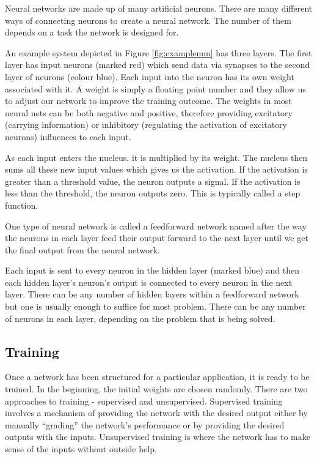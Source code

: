 Neural networks are made up of many artificial neurons. There are many different ways of connecting neurons to create a neural network. The number of them depends on a task the network is designed for.

An example system depicted in Figure \ref{fig:examplennn} has three layers. The first layer has input neurons (marked red) which send data via synapses to the second layer of neurons (colour blue). Each input into the neuron has its own weight associated with it. A weight is simply a floating point number and they allow us to adjust our network to improve the training outcome. The weights in most neural nets can be both negative and positive, therefore providing excitatory (carrying information) or inhibitory (regulating the activation of excitatory neurons) influences to each input. 

As each input enters the nucleus, it is multiplied by its weight. The nucleus then sums all these new input values which gives us the activation. If the activation is greater than a threshold value, the neuron outputs a signal. If the activation is less than the threshold, the neuron outputs zero. This is typically called a step function.

One type of neural network is called a feedforward network named after the way the neurons in each layer feed their output forward to the next layer until we get the final output from the neural network. 
 
Each input is sent to every neuron in the hidden layer (marked blue) and then each hidden layer’s neuron’s output is connected to every neuron in the next layer. There can be any number of hidden layers within a feedforward network but one is usually enough to suffice for most problem. There can be any number of neurons in each layer, depending on the problem that is being solved.

\vspace{10pt}

\subsection{Training}
Once a network has been structured for a particular application, it is ready to be trained. In the beginning, the initial weights are chosen randomly. 
There are two approaches to training - supervised and unsupervised. Supervised training involves a mechanism of providing the network with the desired output either by manually ``grading'' the network's performance or by providing the desired outputs with the inputs. Unsupervised training is where the network has to make sense of the inputs without outside help.

